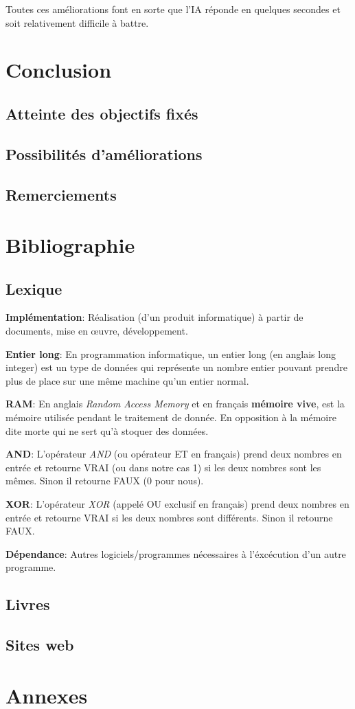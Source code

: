\documentclass[a4paper]{article}
\newcommand{\lexique}[2]{\item{\textbf{#1}:} #2}
\begin{document}
    Toutes ces améliorations font en sorte que l'IA réponde en quelques secondes et soit relativement difficile à battre.

\section{Conclusion}
\subsection{Atteinte des objectifs fixés}
\subsection{Possibilités d'améliorations}
\subsection{Remerciements}

\newpage
\section{Bibliographie}
\subsection{Lexique}
    \begin{description}
        \lexique{Implémentation}{Réalisation (d’un produit informatique) à partir de documents, mise en œuvre, développement.}
        \lexique{Entier long}{En programmation informatique, un entier long (en anglais long integer) est un type de données qui représente un nombre entier pouvant prendre plus de place sur une même machine qu'un entier normal.}
        \lexique{RAM}{En anglais \textit{Random Access Memory} et en français \textbf{mémoire vive}, est la mémoire utilisée pendant le traitement de donnée. En opposition à la mémoire dite morte qui ne sert qu'à stoquer des données.}
        \lexique{AND}{L'opérateur \textit{AND} (ou opérateur ET en français) prend deux nombres en entrée et retourne VRAI (ou dans notre cas 1) si les deux nombres sont les mêmes. Sinon il retourne FAUX (0 pour nous).}
        \lexique{XOR}{L'opérateur \textit{XOR} (appelé OU exclusif en français) prend deux nombres en entrée et retourne VRAI si les deux nombres sont différents. Sinon il retourne FAUX.}
	    \lexique{Dépendance}{Autres logiciels/programmes nécessaires à l'éxcécution d'un autre programme.}
    \end{description}
\subsection{Livres}
\printbibliography[heading=none, type=book]
\subsection{Sites web}
\printbibliography[heading=none, type=misc]

\section{Annexes}
\end{document}
